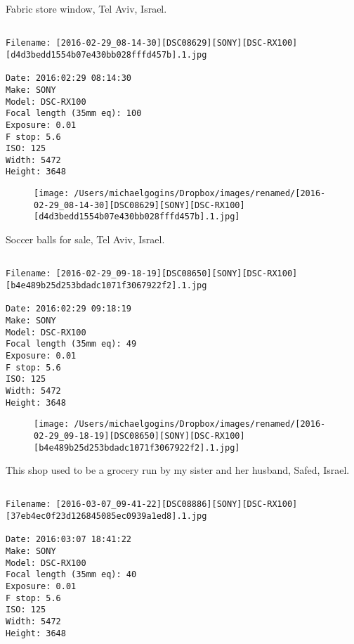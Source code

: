 \clearpage
\onecolumn
\noindent Fabric store window, Tel Aviv, Israel.
\noindent
\begin{lstlisting}

Filename: [2016-02-29_08-14-30][DSC08629][SONY][DSC-RX100][d4d3bedd1554b07e430bb028fffd457b].1.jpg

Date: 2016:02:29 08:14:30
Make: SONY
Model: DSC-RX100
Focal length (35mm eq): 100
Exposure: 0.01
F stop: 5.6
ISO: 125
Width: 5472
Height: 3648
\end{lstlisting}
\clearpage

\begin{figure}
\texttt{[image: /Users/michaelgogins/Dropbox/images/renamed/[2016-02-29\_08-14-30][DSC08629][SONY][DSC-RX100][d4d3bedd1554b07e430bb028fffd457b].1.jpg]}
\end{figure}
    
\clearpage
\onecolumn
\noindent Soccer balls for sale, Tel Aviv, Israel.
\noindent
\begin{lstlisting}

Filename: [2016-02-29_09-18-19][DSC08650][SONY][DSC-RX100][b4e489b25d253bdadc1071f3067922f2].1.jpg

Date: 2016:02:29 09:18:19
Make: SONY
Model: DSC-RX100
Focal length (35mm eq): 49
Exposure: 0.01
F stop: 5.6
ISO: 125
Width: 5472
Height: 3648
\end{lstlisting}
\clearpage

\begin{figure}
\texttt{[image: /Users/michaelgogins/Dropbox/images/renamed/[2016-02-29\_09-18-19][DSC08650][SONY][DSC-RX100][b4e489b25d253bdadc1071f3067922f2].1.jpg]}
\end{figure}
    
\clearpage
\onecolumn
\noindent This shop used to be a grocery run by my sister and her husband, Safed, Israel.
\noindent
\begin{lstlisting}

Filename: [2016-03-07_09-41-22][DSC08886][SONY][DSC-RX100][37eb4ec0f23d126845085ec0939a1ed8].1.jpg

Date: 2016:03:07 18:41:22
Make: SONY
Model: DSC-RX100
Focal length (35mm eq): 40
Exposure: 0.01
F stop: 5.6
ISO: 125
Width: 5472
Height: 3648
\end{lstlisting}
\clearpage


